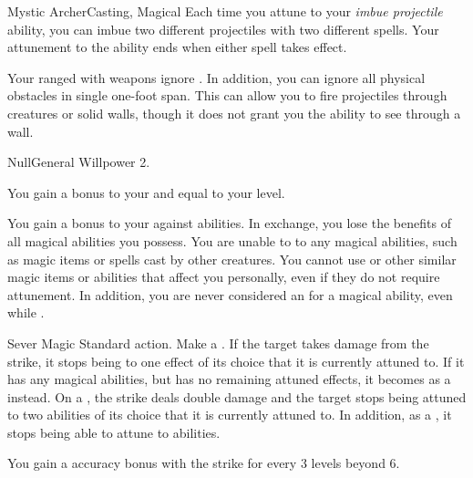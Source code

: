 \begin{magicalfeat}{Mystic Archer}{Casting, Magical}
         Each time you attune to your \textit{imbue projectile} ability, you can imbue two different projectiles with two different spells.
        Your attunement to the ability ends when either spell takes effect.

         Your ranged  with  weapons ignore .
        In addition, you can ignore all physical obstacles in single one-foot span.
        This can allow you to fire projectiles through creatures or solid walls, though it does not grant you the ability to see through a wall.
    \end{magicalfeat}

    \begin{feat}{Null}{General}
        \featpre Willpower 2.

         You gain a bonus to your  and  equal to your level.

         You gain a  bonus to your  against \magical abilities.
        In exchange, you lose the benefits of all magical abilities you possess.
        You are unable to  to any magical abilities, such as magic items or spells cast by other creatures.
        You cannot use  or other similar magic items or abilities that affect you personally, even if they do not require attunement.
        In addition, you are never considered an  for a magical ability, even while \unconscious.

        \begin{activeability}{Sever Magic}
            \abilityusagetime Standard action.
            \rankline
            Make a .
            If the target takes damage from the strike, it stops being  to one effect of its choice that it is currently attuned to.
            If it has any magical abilities, but has no remaining attuned effects, it becomes \stunned as a  instead.
            On a , the strike deals double damage and the target stops being attuned to two abilities of its choice that it is currently attuned to.
            In addition, as a , it stops being able to attune to abilities.

            \rankline
            You gain a  accuracy bonus with the strike for every 3 levels beyond 6.
        \end{activeability}


\end{feat}
